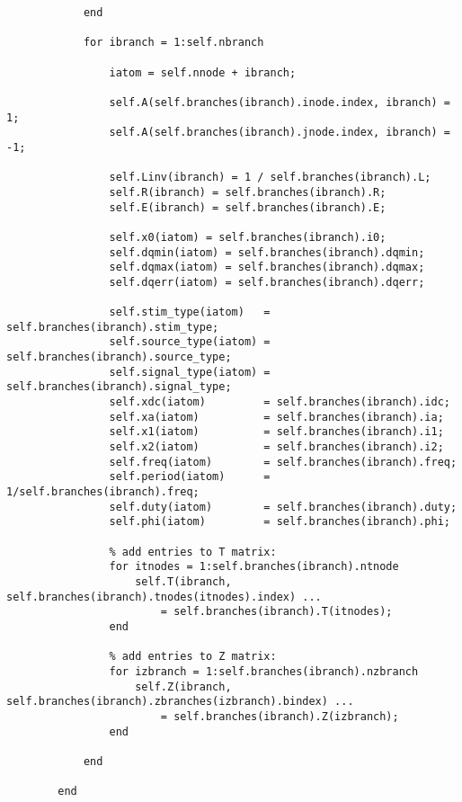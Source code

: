 \begin{lstlisting}
            end 
            
            for ibranch = 1:self.nbranch
                
                iatom = self.nnode + ibranch;
                
                self.A(self.branches(ibranch).inode.index, ibranch) = 1; 
                self.A(self.branches(ibranch).jnode.index, ibranch) = -1; 
 
                self.Linv(ibranch) = 1 / self.branches(ibranch).L;
                self.R(ibranch) = self.branches(ibranch).R;
                self.E(ibranch) = self.branches(ibranch).E;
                
                self.x0(iatom) = self.branches(ibranch).i0;
                self.dqmin(iatom) = self.branches(ibranch).dqmin;
                self.dqmax(iatom) = self.branches(ibranch).dqmax;
                self.dqerr(iatom) = self.branches(ibranch).dqerr;
                
                self.stim_type(iatom)   = self.branches(ibranch).stim_type;
                self.source_type(iatom) = self.branches(ibranch).source_type;
                self.signal_type(iatom) = self.branches(ibranch).signal_type;
                self.xdc(iatom)         = self.branches(ibranch).idc;
                self.xa(iatom)          = self.branches(ibranch).ia;
                self.x1(iatom)          = self.branches(ibranch).i1;
                self.x2(iatom)          = self.branches(ibranch).i2;
                self.freq(iatom)        = self.branches(ibranch).freq;
                self.period(iatom)      = 1/self.branches(ibranch).freq;
                self.duty(iatom)        = self.branches(ibranch).duty;
                self.phi(iatom)         = self.branches(ibranch).phi;

                % add entries to T matrix:
                for itnodes = 1:self.branches(ibranch).ntnode
                    self.T(ibranch, self.branches(ibranch).tnodes(itnodes).index) ...
                        = self.branches(ibranch).T(itnodes);
                end
                
                % add entries to Z matrix:
                for izbranch = 1:self.branches(ibranch).nzbranch
                    self.Z(ibranch, self.branches(ibranch).zbranches(izbranch).bindex) ...
                        = self.branches(ibranch).Z(izbranch);
                end
                
            end
            
        end
        

\end{lstlisting}
